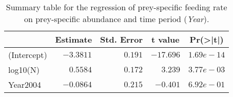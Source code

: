 \begin{table}[!htbp]
\caption{Summary table for the regression of prey-specific feeding rate 
  on prey-specific abundance and time period (\emph{Year}).\label{tab:FNY}} 
\begin{center}
\begin{tabular}{lrrrr}
\hline
\multicolumn{1}{l}{}&\multicolumn{1}{c}{Estimate}&\multicolumn{1}{c}{Std. Error}&\multicolumn{1}{c}{t value}&\multicolumn{1}{c}{Pr(\textgreater |t|)}\tabularnewline
\hline
(Intercept)&$-3.3811$&$0.191$&$-17.696$&$1.69e-14$\tabularnewline
log10(N)&$ 0.5584$&$0.172$&$  3.239$&$3.77e-03$\tabularnewline
Year2004&$-0.0864$&$0.215$&$ -0.401$&$6.92e-01$\tabularnewline
\hline
\end{tabular}\end{center}
\end{table}
